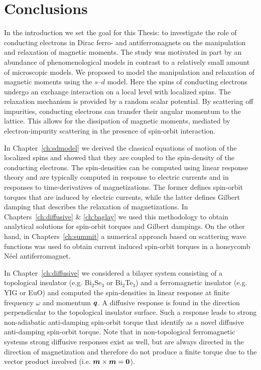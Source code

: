 \chapter{Conclusions}
In the introduction we set the goal for this Thesis: to investigate the role of conducting electrons in Dirac ferro- and antiferromagnets on the manipulation and relaxation of magnetic moments. The study was motivated in part by an abundance of phenomenological models in contrast to a relatively small amount of microscopic models. We proposed to model the manipulation and relaxation of magnetic moments using the $s$--$d$ model. Here the spins of conducting electrons undergo an exchange interaction on a local level with localized spins. The relaxation mechanism is provided by a random scalar potential. By scattering off impurities, conducting electrons can transfer their angular momentum to the lattice. This allows for the dissipation of magnetic moments, mediated by electron-impurity scattering in the presence of spin-orbit interaction. 

In Chapter~\ref{ch:sdmodel} we derived the classical equations of motion of the localized spins and showed that they are coupled to the spin-density of the conducting electrons. The spin-densities can be computed using linear response theory and are typically computed in response to electric currents and in responses to time-derivatives of magnetizations. The former defines spin-orbit torques that are induced by electric currents, while the latter defines Gilbert damping that describes the relaxation of magnetizations. In Chapters~\ref{ch:diffusive} \& \ref{ch:baglay} we used this methodology to obtain analytical solutions for spin-orbit torques and Gilbert dampings. On the other hand, in Chapters~\ref{ch:summit} a numerical approach based on scattering wave functions was used to obtain current induced spin-orbit torques in a honeycomb N\'eel antiferromagnet. 

In Chapter~\ref{ch:diffusive} we considered a bilayer system consisting of a topological insulator (e.g. Bi$_2$Se$_3$ or Bi$_2$Te$_3$) and a ferromagnetic insulator (e.g. YIG or EuO) and computed the spin-densities in linear response at finite frequency $\omega$ and momentum $\boldsymbol{q}$. A diffusive response is found in the direction perpendicular to the topological insulator surface. Such a response leads to strong non-adiabatic anti-damping spin-orbit torque that identify as a novel diffusive anti-damping spin-orbit torque. Note that in non-topological ferromagnetic systems strong diffusive responses exist as well, but are always directed in the direction of magnetization and therefore do not produce a finite torque due to the vector product involved (i.e. $\boldsymbol{m}\times\boldsymbol{m}=\boldsymbol{0}$).

